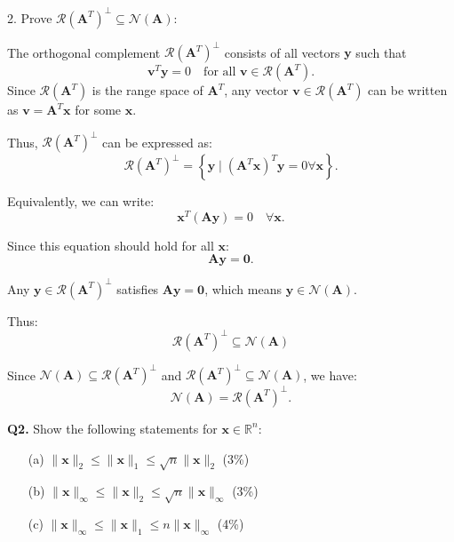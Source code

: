 \documentclass[12pt]{article}
\newcommand{\bvec}[1]{\mathbf{#1}} %
\newcommand{\bmat}[1]{\mathbf{#1}} %
\begin{document}
\begin{itemize}
    2. Prove \( \mathcal{R}(\mathbf{A}^T)^\perp \subseteq \mathcal{N}(\mathbf{A}) \):
    \vspace{\baselineskip}

The orthogonal complement \( \mathcal{R}(\mathbf{A}^T)^\perp \) consists of all vectors \( \mathbf{y} \) such that
\[
\mathbf{v}^T \mathbf{y} = 0 \quad \text{for all } \mathbf{v} \in \mathcal{R}(\mathbf{A}^T).
\]
Since \( \mathcal{R}(\mathbf{A}^T) \) is the range space of \( \mathbf{A}^T \), any vector \( \mathbf{v} \in \mathcal{R}(\mathbf{A}^T) \) can be written as \( \mathbf{v} = \mathbf{A}^T \mathbf{x} \) for some \( \mathbf{x} \).

Thus, \( \mathcal{R}(\mathbf{A}^T)^\perp \) can be expressed as:
\[
\mathcal{R}(\mathbf{A}^T)^\perp = \left\{ \mathbf{y} \mid (\mathbf{A}^T \mathbf{x})^T \mathbf{y} = 0 \forall \mathbf{x} \right\}.
\]

Equivalently, we can write:
\[
\mathbf{x}^T (\mathbf{A} \mathbf{y}) = 0 \quad \forall \mathbf{x}.
\]

Since this equation should hold for all $\bmat{x}$:
\[
\mathbf{A} \mathbf{y} = \mathbf{0}.
\]

Any \( \mathbf{y} \in \mathcal{R}(\mathbf{A}^T)^\perp \) satisfies \( \mathbf{A} \mathbf{y} = \mathbf{0} \), which means \( \mathbf{y} \in \mathcal{N}(\mathbf{A}) \).

Thus:
\[
 \mathcal{R}(\mathbf{A}^T)^\perp \subseteq \mathcal{N}(\mathbf{A})
\]
    \vspace{\baselineskip}

    Since \( \mathcal{N}(\mathbf{A}) \subseteq \mathcal{R}(\mathbf{A}^T)^\perp \) and \( \mathcal{R}(\mathbf{A}^T)^\perp \subseteq \mathcal{N}(\mathbf{A}) \), we have:
    \[
    \mathcal{N}(\mathbf{A}) = \mathcal{R}(\mathbf{A}^T)^\perp.
    \]
\end{itemize}
\vspace{\baselineskip}
\hline
\vspace{\baselineskip}

\textbf{Q2.} Show the following statements for \( \bvec{x} \in \mathbb{R}^n \):
\begin{enumerate}
    \item[(a)] \( \|\bvec{x}\|_2 \leq \|\bvec{x}\|_1 \leq \sqrt{n} \|\bvec{x}\|_2 \) \hfill (3\%)
    \item[(b)] \( \|\bvec{x}\|_\infty \leq \|\bvec{x}\|_2 \leq \sqrt{n} \|\bvec{x}\|_\infty \) \hfill (3\%)
    \item[(c)] \( \|\bvec{x}\|_\infty \leq \|\bvec{x}\|_1 \leq n \|\bvec{x}\|_\infty \) \hfill (4\%)
\end{enumerate}
\end{document}
